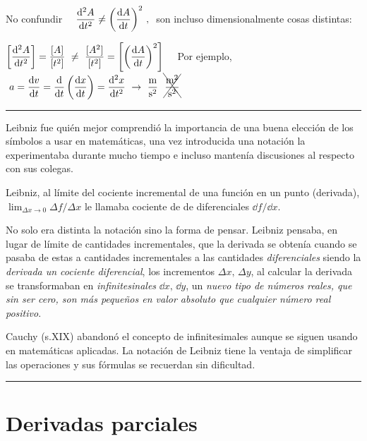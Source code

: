 No confundir $\quad \displaystyle \dv[2]{A}{t} \neq \left( \dv{A}{t} \right)^2\, , \ $ son incluso dimensionalmente cosas distintas: 

\textcolor{gris}{$\displaystyle \left[ \dv[2]{A}{t}  \right]=\dfrac{[A]}{[t^2]} \ \neq \ \dfrac{[A^2]}{[t^2]} = \left[ \left( \dv{A}{t} \right)^2 \right]\quad $ Por ejemplo, $\ \displaystyle a=\dv{v}{t}=\dv{t} \left( \dv{x}{t} \right) = \dv[2]{x}{t} \ \to \ \dfrac {\mathrm{m}}{\mathrm{s}^2} \ \ \bcancel{\cancel{ \dfrac {\mathrm{m}^2}{\mathrm{s}^2} }}$}

\vspace{1cm}
\color{ForestGreen!80}
\rule{250pt}{0.2pt}


\textsf{Leibniz fue quién mejor comprendió la importancia de una buena elección de los símbolos a usar en matemáticas, una vez introducida una notación la experimentaba durante mucho tiempo e incluso mantenía discusiones al respecto con sus colegas.}

\textsf{Leibniz, al límite del cociente incremental de una función en un punto (derivada), $\displaystyle \lim_{\Delta x \to 0} {\Delta f}/{\Delta x}$ le llamaba cociente de de diferenciales $\displaystyle \dd f  / \dd x$.}

\textsf{No solo era distinta la notación sino la forma de pensar. Leibniz pensaba, en lugar de límite de cantidades incrementales, que la derivada se obtenía cuando se pasaba de estas a cantidades incrementales a las cantidades \emph{diferenciales} siendo la \emph{derivada un cociente diferencial}, los incrementos $\Delta x,\, \Delta y$, al calcular la derivada se transformaban en \emph{infinitesinales} $\dd x,\, \dd y$, un \emph{nuevo tipo de números reales, que sin ser cero, son más pequeños en valor absoluto que cualquier número real positivo}.}

\textsf{Cauchy (s.XIX) abandonó el concepto de infinitesimales aunque se siguen usando en matemáticas aplicadas. La notación de Leibniz tiene la ventaja  de simplificar las operaciones y sus fórmulas se recuerdan sin dificultad.}

\vspace{-8mm}
\begin{flushright}
\rule{250pt}{0.2pt}		
\end{flushright}

	
\color{black}





\vspace{1cm}
\section{Derivadas parciales}
\vspace{0.5cm}

